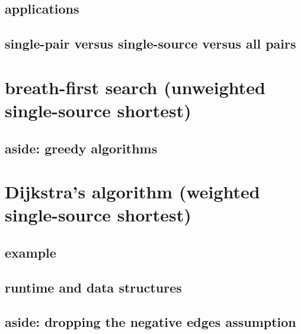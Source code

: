 

\subsection{applications}



\subsection{single-pair versus single-source versus all pairs}



%

\section{breath-first search (unweighted single-source shortest)}



\subsection{aside: greedy algorithms}


\section{Dijkstra's algorithm (weighted single-source shortest)}



\subsection{example}



\subsection{runtime and data structures}



\subsection{aside: dropping the negative edges assumption}





